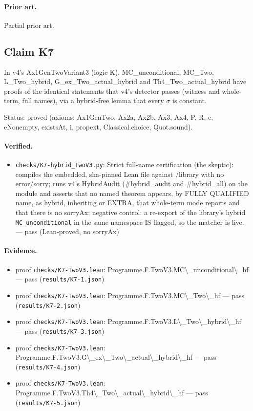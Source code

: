 \documentclass{article}
\begin{document}
\paragraph{Prior art.} Partial prior art.

\subsection*{Claim K7}

In v4's Ax1GenTwoVariant3 (logic K), MC\_unconditional, MC\_Two, L\_Two\_hybrid, G\_ex\_Two\_actual\_hybrid and Th4\_Two\_actual\_hybrid have proofs of the identical statements that v4's detector passes (witness and whole-term, full names), via a hybrid-free lemma that every $\sigma$ is constant.

Status: proved (axioms: Ax1GenTwo, Ax2a, Ax2b, Ax3, Ax4, P, R, e, eNonempty, existsAt, i, propext, Classical.choice, Quot.sound).

\paragraph{Verified.}
\begin{itemize}
\item \texttt{checks/K7-hybrid\_TwoV3.py}: Strict full-name certification (the skeptic): compiles the embedded, sha-pinned Lean file against /library with no error/sorry; runs v4's HybridAudit (\#hybrid\_audit and \#hybrid\_all) on the module and asserts that no named theorem appears, by FULLY QUALIFIED name, as hybrid, inheriting or EXTRA, that whole-term mode reports and that there is no sorryAx; negative control: a re-export of the library's hybrid \texttt{MC\_unconditional} in the same namespace IS flagged, so the matcher is live. --- pass (Lean-proved, no sorryAx)
\end{itemize}

\paragraph{Evidence.}
\begin{itemize}
\item proof \texttt{checks/K7-TwoV3.lean}: Programme.F.TwoV3.MC\textbackslash{}\_unconditional\textbackslash{}\_hf --- pass (\texttt{results/K7-1.json})
\item proof \texttt{checks/K7-TwoV3.lean}: Programme.F.TwoV3.MC\textbackslash{}\_Two\textbackslash{}\_hf --- pass (\texttt{results/K7-2.json})
\item proof \texttt{checks/K7-TwoV3.lean}: Programme.F.TwoV3.L\textbackslash{}\_Two\textbackslash{}\_hybrid\textbackslash{}\_hf --- pass (\texttt{results/K7-3.json})
\item proof \texttt{checks/K7-TwoV3.lean}: Programme.F.TwoV3.G\textbackslash{}\_ex\textbackslash{}\_Two\textbackslash{}\_actual\textbackslash{}\_hybrid\textbackslash{}\_hf --- pass (\texttt{results/K7-4.json})
\item proof \texttt{checks/K7-TwoV3.lean}: Programme.F.TwoV3.Th4\textbackslash{}\_Two\textbackslash{}\_actual\textbackslash{}\_hybrid\textbackslash{}\_hf --- pass (\texttt{results/K7-5.json})
\end{itemize}
\end{document}
